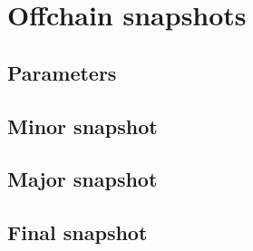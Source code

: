 \documentclass[../hydrozoa.tex]{subfiles}
\begin{document}
\chapter{Offchain snapshots}%
\label{h:offchain-snapshots}

\section{Parameters}%
\label{h:snapshot-parameters}


\section{Minor snapshot}%
\label{h:minor-snapshot}




\section{Major snapshot}%
\label{h:major-snapshot}




\section{Final snapshot}%
\label{h:final-snapshot}



\end{document}
